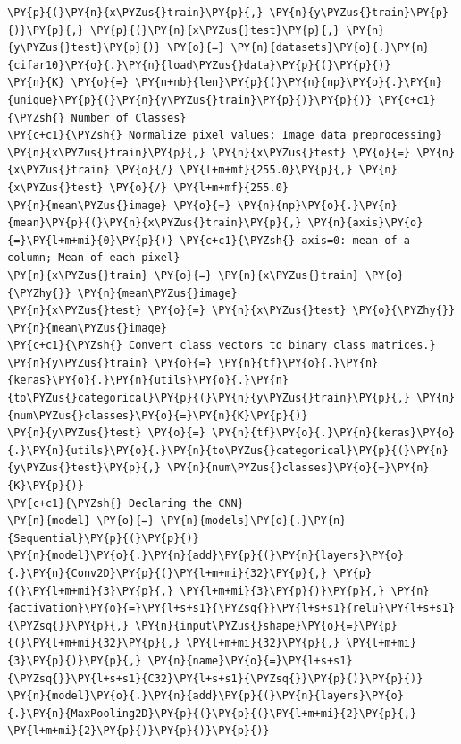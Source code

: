 \documentclass[a4paper,11pt]{article}%
\begin{document}
    \begin{tcolorbox}[breakable, size=fbox, boxrule=1pt, pad at break*=1mm,colback=cellbackground, colframe=cellborder]
\begin{Verbatim}[commandchars=\\\{\}]
\PY{p}{(}\PY{n}{x\PYZus{}train}\PY{p}{,} \PY{n}{y\PYZus{}train}\PY{p}{)}\PY{p}{,} \PY{p}{(}\PY{n}{x\PYZus{}test}\PY{p}{,} \PY{n}{y\PYZus{}test}\PY{p}{)} \PY{o}{=} \PY{n}{datasets}\PY{o}{.}\PY{n}{cifar10}\PY{o}{.}\PY{n}{load\PYZus{}data}\PY{p}{(}\PY{p}{)}
\PY{n}{K} \PY{o}{=} \PY{n+nb}{len}\PY{p}{(}\PY{n}{np}\PY{o}{.}\PY{n}{unique}\PY{p}{(}\PY{n}{y\PYZus{}train}\PY{p}{)}\PY{p}{)} \PY{c+c1}{\PYZsh{} Number of Classes}
\PY{c+c1}{\PYZsh{} Normalize pixel values: Image data preprocessing}
\PY{n}{x\PYZus{}train}\PY{p}{,} \PY{n}{x\PYZus{}test} \PY{o}{=} \PY{n}{x\PYZus{}train} \PY{o}{/} \PY{l+m+mf}{255.0}\PY{p}{,} \PY{n}{x\PYZus{}test} \PY{o}{/} \PY{l+m+mf}{255.0}
\PY{n}{mean\PYZus{}image} \PY{o}{=} \PY{n}{np}\PY{o}{.}\PY{n}{mean}\PY{p}{(}\PY{n}{x\PYZus{}train}\PY{p}{,} \PY{n}{axis}\PY{o}{=}\PY{l+m+mi}{0}\PY{p}{)} \PY{c+c1}{\PYZsh{} axis=0: mean of a column; Mean of each pixel}
\PY{n}{x\PYZus{}train} \PY{o}{=} \PY{n}{x\PYZus{}train} \PY{o}{\PYZhy{}} \PY{n}{mean\PYZus{}image}
\PY{n}{x\PYZus{}test} \PY{o}{=} \PY{n}{x\PYZus{}test} \PY{o}{\PYZhy{}} \PY{n}{mean\PYZus{}image}
\PY{c+c1}{\PYZsh{} Convert class vectors to binary class matrices.}
\PY{n}{y\PYZus{}train} \PY{o}{=} \PY{n}{tf}\PY{o}{.}\PY{n}{keras}\PY{o}{.}\PY{n}{utils}\PY{o}{.}\PY{n}{to\PYZus{}categorical}\PY{p}{(}\PY{n}{y\PYZus{}train}\PY{p}{,} \PY{n}{num\PYZus{}classes}\PY{o}{=}\PY{n}{K}\PY{p}{)}
\PY{n}{y\PYZus{}test} \PY{o}{=} \PY{n}{tf}\PY{o}{.}\PY{n}{keras}\PY{o}{.}\PY{n}{utils}\PY{o}{.}\PY{n}{to\PYZus{}categorical}\PY{p}{(}\PY{n}{y\PYZus{}test}\PY{p}{,} \PY{n}{num\PYZus{}classes}\PY{o}{=}\PY{n}{K}\PY{p}{)}
\PY{c+c1}{\PYZsh{} Declaring the CNN}
\PY{n}{model} \PY{o}{=} \PY{n}{models}\PY{o}{.}\PY{n}{Sequential}\PY{p}{(}\PY{p}{)}
\PY{n}{model}\PY{o}{.}\PY{n}{add}\PY{p}{(}\PY{n}{layers}\PY{o}{.}\PY{n}{Conv2D}\PY{p}{(}\PY{l+m+mi}{32}\PY{p}{,} \PY{p}{(}\PY{l+m+mi}{3}\PY{p}{,} \PY{l+m+mi}{3}\PY{p}{)}\PY{p}{,} \PY{n}{activation}\PY{o}{=}\PY{l+s+s1}{\PYZsq{}}\PY{l+s+s1}{relu}\PY{l+s+s1}{\PYZsq{}}\PY{p}{,} \PY{n}{input\PYZus{}shape}\PY{o}{=}\PY{p}{(}\PY{l+m+mi}{32}\PY{p}{,} \PY{l+m+mi}{32}\PY{p}{,} \PY{l+m+mi}{3}\PY{p}{)}\PY{p}{,} \PY{n}{name}\PY{o}{=}\PY{l+s+s1}{\PYZsq{}}\PY{l+s+s1}{C32}\PY{l+s+s1}{\PYZsq{}}\PY{p}{)}\PY{p}{)}
\PY{n}{model}\PY{o}{.}\PY{n}{add}\PY{p}{(}\PY{n}{layers}\PY{o}{.}\PY{n}{MaxPooling2D}\PY{p}{(}\PY{p}{(}\PY{l+m+mi}{2}\PY{p}{,} \PY{l+m+mi}{2}\PY{p}{)}\PY{p}{)}\PY{p}{)}

\end{Verbatim}
\end{tcolorbox}
\end{document}
